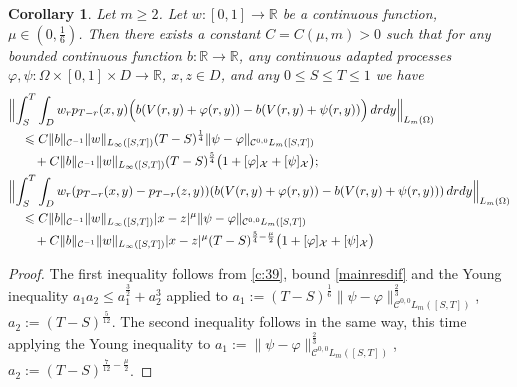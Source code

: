 \documentclass[12pt]{article}
\newtheorem{corollary}[theorem]{Corollary}
\theoremstyle{definition}
\DeclareMathOperator{\1}{\mathbbm{1}}%
\def\phi{\varphi}
\renewcommand{\ge}{\geqslant}
\renewcommand{\le}{\leqslant}
\newcommand{\nn}{\nonumber}
\newcommand{\C}{\mathcal{C}}
\newcommand{\R}{\mathbb{R}}
\newcommand{\X}{\mathcal{X}}
\begin{document}
\begin{corollary}\label{c:310}
Let $m\ge2$. Let $w\colon[0,1]\to\R$ be a continuous function, $\mu\in(0,\frac16)$. 
Then there exists a constant $C=C(\mu,m)>0$ such that for any bounded continuous function $b\colon\R\to\R$, any continuous adapted processes  $\phi,\psi\colon\Omega\times[0,1]\times D\to\R$, $x,z\in D$, and any $0\le S\le T\le 1$ we have 
\begin{align}%
&\Bigl\|\int_S^T \int_D w_r p_{T-r}(x,y)\Bigl(b( V(r,y)+\phi(r,y))- b( V(r,y)+\psi(r,y))\Bigr)\,dr dy\Bigr\|_{L_m(\Omega)}\nn\\
&\quad\le  C \|b\|_{\C^{-1}}\|w\|_{L_\infty([S,T])} (T-S)^{\frac14}\|\psi-\phi\|_{\C^{0,0}L_m([S,T])}\nn\\
&\qquad+ C \|b\|_{\C^{-1}}\|w\|_{L_\infty([S,T])}(T-S)^{\frac54}\bigl(1+[\phi]_{\X}+[\psi]_{\X}\bigr);\\
&\Bigl\|\int_S^T \int_D  w_r(p_{T-r}(x,y)-p_{T-r}(z,y)) (b( V(r,y)+\phi(r,y))-b( V(r,y)+\psi(r,y)))\,dr dy\Bigr\|_{L_m(\Omega)}\nn\\
&\quad\le  C \|b\|_{\C^{-1}}\|w\|_{L_\infty([S,T])} |x-z|^\mu \|\psi-\phi\|_{\C^{0,0}L_m([S,T])}\nn\\
&\qquad+ C \|b\|_{\C^{-1}} \|w\|_{L_\infty([S,T])} |x-z|^\mu (T-S)^{\frac{5}4-\frac\mu2}\bigl(1+[\phi]_{\X}+[\psi]_{\X}\bigr) \nn
 \end{align}
\end{corollary}
\begin{proof}
The first inequality follows from  \cref{c:39}, bound \eqref{mainresdif} and the Young inequality ${a_1 a_2\le  a_1^{\frac32} + a_2^3}$ applied to $a_1:=(T-S)^{\frac1{6}}\|\psi-\phi\|_{\C^{0,0}L_m([S,T])}^{\frac23}$, $a_2:=(T-S)^{\frac5{12}}$. 
The second inequality follows in the same way, this time applying the Young inequality to $a_1:=\|\psi-\phi\|_{\C^{0,0}L_m([S,T])}^{\frac23}$, $a_2:=(T-S)^{\frac7{12}-\frac\mu2}$. 
\end{proof}
\end{document}
